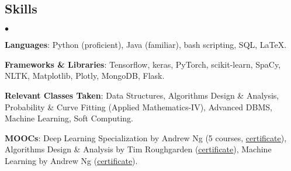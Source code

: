 \documentclass[margin,line]{res}
\newenvironment{list2}{
  \begin{list}{$\bullet$}{%
      \setlength{\itemsep}{0in}
      \setlength{\parsep}{0in} \setlength{\parskip}{0in}
      \setlength{\topsep}{0in} \setlength{\partopsep}{0in}
      \setlength{\leftmargin}{0.2in}}}{\end{list}}
\begin{document}
\begin{resume}
\iffalse
\section{\sc Technical Skills}
{\bf Strongest Areas}: Machine Learning (Classification, Regression, Feature Engineering), Algorithms, Statistical Data Analysis\\
{\bf Languages/Tools/Software}: Python (scikit-learn, Keras, NumPy, Pandas \& others), Java, SQL, MongoDB, \LaTeX, MS Excel
\fi

\section{\sc Skills}
\begin{list2}
\item {\bf Languages}: Python (proficient), Java (familiar), bash scripting, SQL, \LaTeX. 
\item {\bf Frameworks \& Libraries}: Tensorflow, keras, PyTorch, scikit-learn, SpaCy, NLTK, Matplotlib, Plotly, MongoDB, Flask.
\item {\bf Relevant Classes Taken}: Data Structures, Algorithms Design \& Analysis, Probability \& Curve Fitting (Applied Mathematics-IV), Advanced DBMS, Machine Learning, Soft Computing.
\item {\bf MOOCs}: Deep Learning Specialization by Andrew Ng (5 courses, {\href{https://www.coursera.org/account/accomplishments/specialization/WK4DU58W9DV5}{\underline{certificate}}}), Algorithms Design \& Analysis by Tim Roughgarden ({\href{https://www.coursera.org/account/accomplishments/verify/S8RN7R4ZZQSR}{\underline{certificate}}}), Machine Learning by Andrew Ng ({\href{https://www.coursera.org/account/accomplishments/verify/37T4VG9ZN7EY}{\underline{certificate}}}).
\end{list2}


\end{resume}
\end{document}
